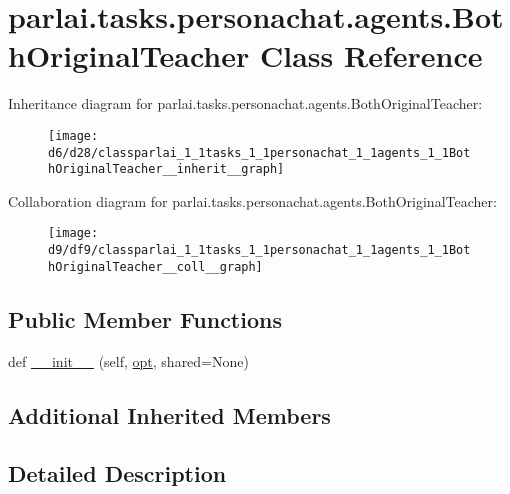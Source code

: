 \hypertarget{classparlai_1_1tasks_1_1personachat_1_1agents_1_1BothOriginalTeacher}{}\section{parlai.\+tasks.\+personachat.\+agents.\+Both\+Original\+Teacher Class Reference}
\label{classparlai_1_1tasks_1_1personachat_1_1agents_1_1BothOriginalTeacher}


Inheritance diagram for parlai.\+tasks.\+personachat.\+agents.\+Both\+Original\+Teacher\+:
\nopagebreak
\begin{figure}[H]
\begin{center}
\leavevmode
\texttt{[image: d6/d28/classparlai\_1\_1tasks\_1\_1personachat\_1\_1agents\_1\_1BothOriginalTeacher\_\_inherit\_\_graph]}
\end{center}
\end{figure}


Collaboration diagram for parlai.\+tasks.\+personachat.\+agents.\+Both\+Original\+Teacher\+:
\nopagebreak
\begin{figure}[H]
\begin{center}
\leavevmode
\texttt{[image: d9/df9/classparlai\_1\_1tasks\_1\_1personachat\_1\_1agents\_1\_1BothOriginalTeacher\_\_coll\_\_graph]}
\end{center}
\end{figure}
\subsection*{Public Member Functions}
\begin{DoxyCompactItemize}
\item 
def \hyperlink{classparlai_1_1tasks_1_1personachat_1_1agents_1_1BothOriginalTeacher_a9d8162c6d1b012a1c9961f0aaedcb9cf}{\+\_\+\+\_\+init\+\_\+\+\_\+} (self, \hyperlink{classparlai_1_1core_1_1teachers_1_1FbDialogTeacher_af7a9ec497b9cd0292d7b8fa220da7c28}{opt}, shared=None)
\end{DoxyCompactItemize}
\subsection*{Additional Inherited Members}


\subsection{Detailed Description}


